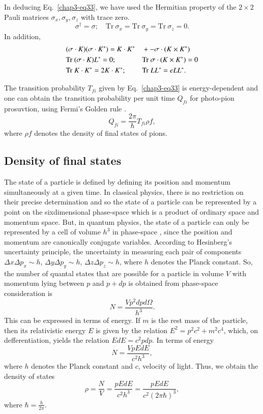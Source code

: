 In deducing Eq.\ \eqref{chap3-eq33}, we have used the Hermitian property of the $2 \times 2$ Pauli matrices $\sigma_x, \sigma_y, \sigma_z$ with trace zero.
$$
\sigma^\dagger = \sigma; \quad \text{Tr}~ \sigma_x = \text{Tr}~ \sigma_y = \text{Tr}~ \sigma_z =0.
$$
In addition,
\begin{alignat*}{3}
  &({\boldmath  \sigma \cdot K}) ({\boldmath  \sigma \cdot K}^\ast) = {\boldmath  K \cdot K}^\ast && + - {\boldmath  \sigma \cdot (K \times K^\ast)}\\
  & \text{Tr}~  ({\boldmath  \sigma \cdot K})L^\ast =0; && \text{Tr}~ \sigma \cdot ({\boldmath  K \times K}^\ast)=0\\
  & \text{Tr}~ {\boldmath  K \cdot K}^\ast = 2 {\boldmath  K \cdot K}^\ast; & &\text{Tr}~LL^\ast = e LL^\ast.
\end{alignat*}

The transition probability $T_{fi}$ given by Eq.\ \eqref{chap3-eq33} is energy-dependent and one can obtain the transition probability per unit time $Q_{fi}$ for photo-pion prosuvtion, using Fermi's Golden rule \cite{chap3-key23}.
\begin{equation}
  Q_{fi}= \frac{2 \pi}{\hbar} T_{fi} \rho f, \label{chap3-eq34}
\end{equation}
where $\rho f$ denotes the density of final states of pions.

\subsection{Density of final states}\label{chap3-sec4.1}

The state of a particle is defined by defining its position and momentum simultaneously at a given time. In classical physics, there is no restriction on their precise determination and so the state of a particle can be represented by a point on the sixdimensional phase-space which is a product of ordinary space and momentum space. But, in quantum physics, the state of a particle can only be represented by a cell of volume $h^3$ in phase-space \cite{chap3-key24}, since the position and momentum are canonically conjugate variables. According to Hesinberg’s uncertainty principle, the uncertainty in measuring each pair of components $\Delta x \Delta p_x \sim h$, $\Delta y \Delta p_y \sim h$, $\Delta z \Delta p_z \sim h$, where $h$ denotes the Planck constant. So, the number of quantal states that are possible for a particle in volume $V$ with momentum lying between $p$ and $p + dp$ is obtained from phase-space consideration \cite{chap3-key24} is
$$
N = \frac{Vp^2 dpd\Omega}{h^3}.
$$
This can be expressed in terms of energy. If $m$ is the rest mass of the particle, then its relativistic energy $E$ is given by the relation $E^2= p^2 c^2+ m^2 c^4$, which, on defferentiation, yields the relation $EdE=c^2pdp$. In terms of energy
$$
N= \frac{Vp{EdE}}{c^2 h^3},
$$
where $h$ denotes the Planck constant and $c$, velocity of light. Thus, we obtain the density of states
$$
\rho = \frac{N}{V} = \frac{p{EdE}}{c^2 h^3} = \frac{p{EdE}}{c^2 (2\pi \hbar)^3},
$$
where $\hbar = \tfrac{h}{2\pi}$.

